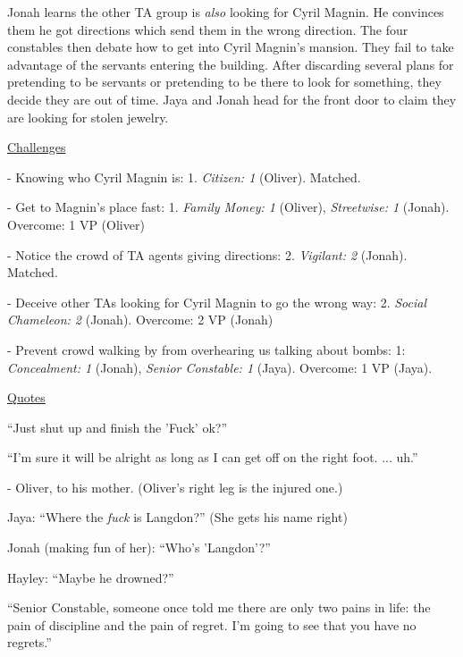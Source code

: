 Jonah learns the other TA group is \textit{also} looking for Cyril Magnin.  He convinces them he got directions which send them in the wrong direction.  The four constables then debate how to get into Cyril Magnin's mansion.  They fail to take advantage of the servants entering the building.  After discarding several plans for pretending to be servants or pretending to be there to look for something, they decide they are out of time.  Jaya and Jonah head for the front door to claim they are looking for stolen jewelry.



\underline{  {\LARGE Challenges }  }



- Knowing who Cyril Magnin is: 1.  \textit{Citizen: 1} (Oliver).  Matched.

- Get to Magnin's place fast: 1.  \textit{Family Money: 1} (Oliver), \textit{Streetwise: 1} (Jonah). Overcome: 1 VP (Oliver)

- Notice the crowd of TA agents giving directions: 2.  \textit{Vigilant: 2} (Jonah).  Matched.

- Deceive other TAs looking for Cyril Magnin to go the wrong way: 2.  \textit{Social Chameleon: 2} (Jonah). Overcome: 2 VP (Jonah)

- Prevent crowd walking by from overhearing us talking about bombs: 1: \textit{Concealment: 1} (Jonah), \textit{Senior Constable: 1} (Jaya).  Overcome: 1 VP (Jaya).



\underline{  {\LARGE Quotes }  }



``Just shut up and finish the 'Fuck' ok?''




``I'm sure it will be alright as long as I can get off on the right foot. ... uh.'' 

                - Oliver, to his mother.  (Oliver's right leg is the injured one.)



Jaya: ``Where the \textit{fuck} is Langdon?'' (She gets his name right)

Jonah (making fun of her): ``Who's 'Langdon'?''

Hayley: ``Maybe he drowned?''



``Senior Constable, someone once told me there are only two pains in life: the pain of discipline and the pain of regret.  I'm going to see that you have no regrets.''

